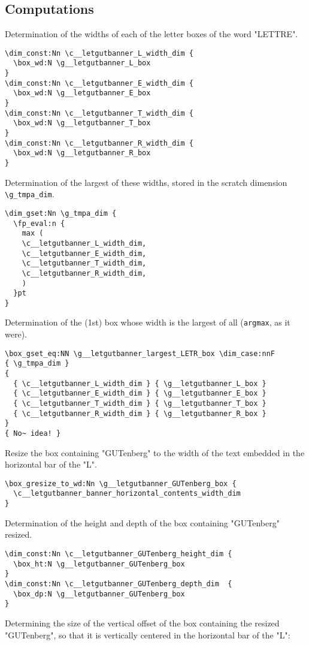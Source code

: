\documentclass{letgut}
\begin{document}
\subsection{Computations}
\label{ImplementationComputations-r7bhxqt0fck0}
Determination of the widths of each of the letter boxes of the word "LETTRE".
\begin{lstlisting}
\dim_const:Nn \c__letgutbanner_L_width_dim {
  \box_wd:N \g__letgutbanner_L_box
}
\dim_const:Nn \c__letgutbanner_E_width_dim {
  \box_wd:N \g__letgutbanner_E_box
}
\dim_const:Nn \c__letgutbanner_T_width_dim {
  \box_wd:N \g__letgutbanner_T_box
}
\dim_const:Nn \c__letgutbanner_R_width_dim {
  \box_wd:N \g__letgutbanner_R_box
}
\end{lstlisting}
Determination of the largest of these widths, stored in the scratch dimension
\lstinline+\g_tmpa_dim+.
\begin{lstlisting}
\dim_gset:Nn \g_tmpa_dim {
  \fp_eval:n {
    max (
    \c__letgutbanner_L_width_dim,
    \c__letgutbanner_E_width_dim,
    \c__letgutbanner_T_width_dim,
    \c__letgutbanner_R_width_dim,
    )
  }pt
}
\end{lstlisting}
Determination of the (1st) box whose width is the largest of all (\lstinline+argmax+, as
it were).
\begin{lstlisting}
\box_gset_eq:NN \g__letgutbanner_largest_LETR_box \dim_case:nnF
{ \g_tmpa_dim }
{
  { \c__letgutbanner_L_width_dim } { \g__letgutbanner_L_box }
  { \c__letgutbanner_E_width_dim } { \g__letgutbanner_E_box }
  { \c__letgutbanner_T_width_dim } { \g__letgutbanner_T_box }
  { \c__letgutbanner_R_width_dim } { \g__letgutbanner_R_box }
}
{ No~ idea! }
\end{lstlisting}
Resize the box containing "GUTenberg" to the width of the text embedded in the
horizontal bar of the "L".
\begin{lstlisting}
\box_gresize_to_wd:Nn \g__letgutbanner_GUTenberg_box {
  \c__letgutbanner_banner_horizontal_contents_width_dim
}
\end{lstlisting}
Determination of the height and depth of the box containing "GUTenberg" resized.
\begin{lstlisting}
\dim_const:Nn \c__letgutbanner_GUTenberg_height_dim {
  \box_ht:N \g__letgutbanner_GUTenberg_box
}
\dim_const:Nn \c__letgutbanner_GUTenberg_depth_dim  {
  \box_dp:N \g__letgutbanner_GUTenberg_box
}
\end{lstlisting}
Determining the size of the vertical offset of the box containing the resized
"GUTenberg", so that it is vertically centered in the horizontal bar of the "L":
\end{document}
